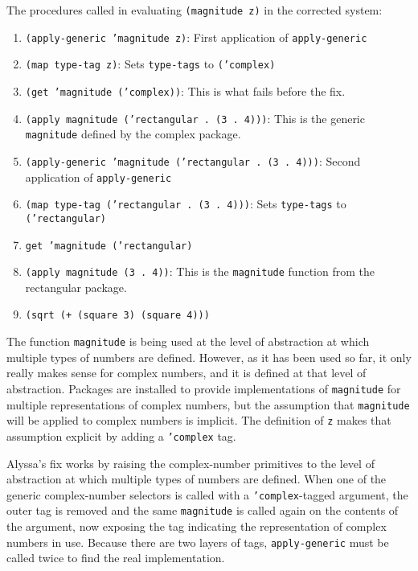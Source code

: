 \documentclass{article}
\begin{document}
The procedures called in evaluating \texttt{(magnitude z)} in the corrected
system:
\begin{enumerate}
    \item \texttt{(apply-generic 'magnitude z)}: First application of
        \texttt{apply-generic}
    \item \texttt{(map type-tag z)}: Sets \texttt{type-tags} to
        \texttt{('complex)}
    \item \texttt{(get 'magnitude ('complex))}: This is what fails before the
        fix.
    \item \texttt{(apply magnitude ('rectangular . (3 . 4)))}: This is the
        generic \texttt{magnitude} defined by the complex package.
    \item \texttt{(apply-generic 'magnitude ('rectangular . (3 . 4)))}: Second
        application of \texttt{apply-generic}
    \item \texttt{(map type-tag ('rectangular . (3 . 4)))}: Sets
        \texttt{type-tags} to \texttt{('rectangular)}
    \item \texttt{get 'magnitude ('rectangular)}
    \item \texttt{(apply magnitude (3 . 4))}: This is the \texttt{magnitude}
        function from the rectangular package.
    \item \texttt{(sqrt (+ (square 3) (square 4)))}
\end{enumerate}

The function \texttt{magnitude} is being used at the level of abstraction at
which multiple types of numbers are defined. However, as it has been used so
far, it only really makes sense for complex numbers, and it is defined at that
level of abstraction. Packages are installed to provide implementations of
\texttt{magnitude} for multiple representations of complex numbers, but the
assumption that \texttt{magnitude} will be applied to complex numbers is
implicit. The definition of \texttt{z} makes that assumption explicit by adding
a \texttt{'complex} tag.

Alyssa's fix works by raising the complex-number primitives to the level of
abstraction at which multiple types of numbers are defined. When one of the
generic complex-number selectors is called with a \texttt{'complex}-tagged
argument, the outer tag is removed and the same \texttt{magnitude} is called
again on the contents of the argument, now exposing the tag indicating the
representation of complex numbers in use. Because there are two layers of tags,
\texttt{apply-generic} must be called twice to find the real implementation.
\end{document}
